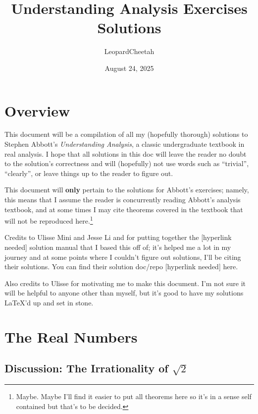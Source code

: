 \documentclass[12pt]{article}
\title{Understanding Analysis Exercises Solutions}
\author{LeopardCheetah}
\date{August 24, 2025}
\begin{document}
 
\maketitle
\newpage


\section*{Overview}

This document will be a compilation of all my (hopefully thorough) solutions to Stephen Abbott's \textit{Understanding Analysis}, a classic undergraduate textbook in real analysis. I hope that all solutions in this doc will leave the reader no doubt to the solution's correctness and will (hopefully) not use words such as ``trivial'', ``clearly'', or leave things up to the reader to figure out.

This document will \textbf{only} pertain to the solutions for Abbott's exercises; namely, this means that I assume the reader is concurrently reading Abbott's analysis textbook, and at some times I may cite theorems covered in the textbook that will not be reproduced here.\footnote{Maybe. Maybe I'll find it easier to put all theorems here so it's in a sense self contained but that's to be decided.}

Credits to Ulisse Mini and Jesse Li and for putting together the [hyperlink needed] solution manual that I based this off of; it's helped me a lot in my journey and at some points where I couldn't figure out solutions, I'll be citing their solutions. You can find their solution doc/repo [hyperlink needed] here.

Also credits to Ulisse for motivating me to make this document. I'm not sure it will be helpful to anyone other than myself, but it's good to have my solutions \LaTeX'd up and set in stone.

\newpage



\section{The Real Numbers}

\subsection{Discussion: The Irrationality of \(\sqrt{2}\) }
\end{document}
